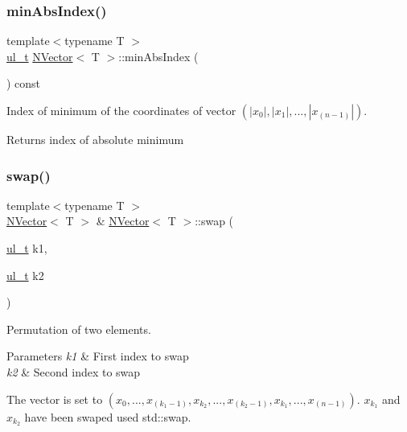 \subsubsection{\texorpdfstring{minAbsIndex()}{minAbsIndex()}}
{\footnotesize\ttfamily template$<$typename T $>$ \\
\mbox{\hyperlink{group___n_algebra_ga1b140a2034db3f5dfe18a987745df43a}{ul\+\_\+t}} \mbox{\hyperlink{class_n_vector}{N\+Vector}}$<$ T $>$\+::min\+Abs\+Index (\begin{DoxyParamCaption}{ }\end{DoxyParamCaption}) const}



Index of minimum of the coordinates of vector $ (|x_0|, |x_1|, ..., |x_{(n-1)}|) $. 

\begin{DoxyReturn}{Returns}
index of absolute minimum 
\end{DoxyReturn}
\mbox{\label{class_n_vector_a8ea2e2cffa2c3053d835d05a571dac88}} 
\subsubsection{\texorpdfstring{swap()}{swap()}}
{\footnotesize\ttfamily template$<$typename T $>$ \\
\mbox{\hyperlink{class_n_vector}{N\+Vector}}$<$ T $>$ \& \mbox{\hyperlink{class_n_vector}{N\+Vector}}$<$ T $>$\+::swap (\begin{DoxyParamCaption}\item[{\mbox{\hyperlink{group___n_algebra_ga1b140a2034db3f5dfe18a987745df43a}{ul\+\_\+t}}}]{k1,  }\item[{\mbox{\hyperlink{group___n_algebra_ga1b140a2034db3f5dfe18a987745df43a}{ul\+\_\+t}}}]{k2 }\end{DoxyParamCaption})}



Permutation of two elements. 


\begin{DoxyParams}{Parameters}
{\em k1} & First index to swap \\
\hline
{\em k2} & Second index to swap\\
\hline
\end{DoxyParams}
The vector is set to $ (x_0, ..., x_{(k_1 - 1)}, x_{k_2}, ..., x_{(k_2 - 1)}, x_{k_1}, ..., x_{(n-1)}) $. $ x_{k_1} $ and $ x_{k_2} $ have been swaped used {\ttfamily std\+::swap}. \mbox{\label{class_n_vector_aabe8585ef2659ce3fa7872c2b96e3b20}} 
